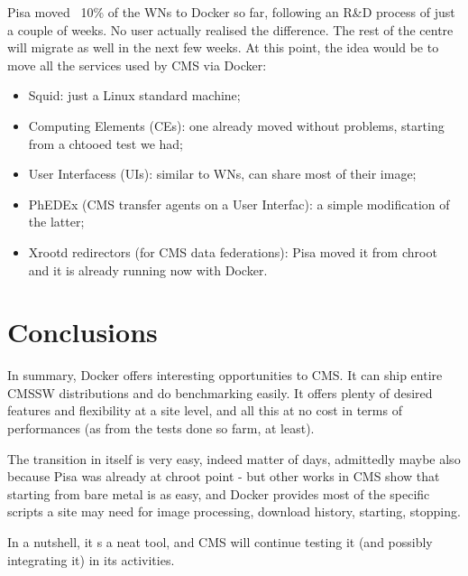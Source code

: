 \documentclass{PoS}
\begin{document}
%
Pisa moved ~10\% of the WNs to Docker so far, following an R\&D process of just a couple of weeks. No user actually realised the difference. The rest of the centre will migrate as well in the next few weeks. At this point, the idea would be to move all the services used by CMS via Docker:
\begin{itemize}
\item Squid: just a Linux standard machine;
\item Computing Elements (CEs): one already moved without problems, starting from a chtooed test we had;
\item User Interfacess (UIs): similar to WNs, can share most of their image; 
\item PhEDEx (CMS transfer agents on a User Interfac): a simple modification of the latter;
\item Xrootd redirectors (for CMS data federations): Pisa moved it from chroot and it is already running now with Docker.
\end{itemize}

\section{Conclusions}

In summary, Docker offers interesting opportunities to CMS. It can ship entire CMSSW distributions and do benchmarking easily. It offers plenty of desired features and flexibility at a site level, and all this at no cost in terms of performances (as from the tests done so farm, at least).

The transition in itself is very easy, indeed matter of days, admittedly maybe also because Pisa was already at chroot point - but other works in CMS show that starting from bare metal is as easy,    and Docker provides most of the specific scripts a site may need for image processing, download history, starting, stopping.

In a nutshell, it s a neat tool, and CMS will continue testing it (and possibly integrating it) in its activities.
\end{document}
